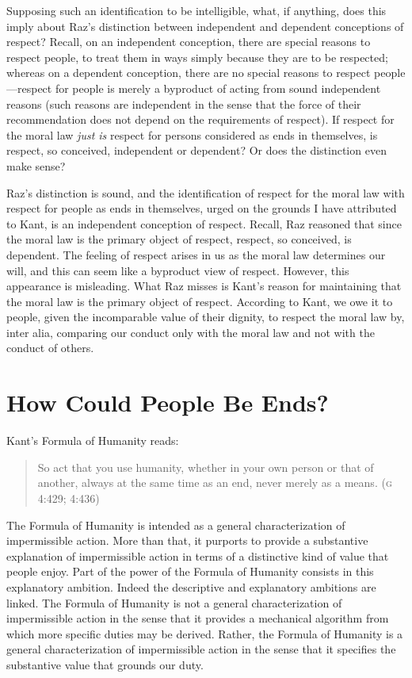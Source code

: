 \documentclass[12pt]{article}
\begin{document}
Supposing such an identification to be intelligible, what, if anything, does this imply about Raz's distinction between independent and dependent conceptions of respect? Recall, on an independent conception, there are special reasons to respect people, to treat them in ways simply because they are to be respected; whereas on a dependent conception, there are no special reasons to respect people---respect for people is merely a byproduct of acting from sound independent reasons (such reasons are independent in the sense that the force of their recommendation does not depend on the requirements of respect). If respect for the moral law \emph{just is} respect for persons considered as ends in themselves, is respect, so conceived, independent or dependent? Or does the distinction even make sense?

Raz's distinction is sound, and the identification of respect for the moral law with respect for people as ends in themselves, urged on the grounds I have attributed to Kant, is an independent conception of respect. Recall, Raz reasoned that since the moral law is the primary object of respect, respect, so conceived, is dependent. The feeling of respect arises in us as the moral law determines our will, and this can seem like a byproduct view of respect. However, this appearance is misleading. What Raz misses is Kant's reason for maintaining that the moral law is the primary object of respect. According to Kant, we owe it to people, given the incomparable value of their dignity, to respect the moral law by, inter alia, comparing our conduct only with the moral law and not with the conduct of others.


\section{How Could People Be Ends?} \label{sec:how_could_people_be_ends} %

Kant's Formula of Humanity reads: 
\begin{quote}
	So act that you use humanity, whether in your own person or that of another, always at the same time as an end, never merely as a means. (\textsc{g} 4:429; 4:436) 
\end{quote}

The Formula of Humanity is intended as a general characterization of impermissible action. More than that, it purports to provide a substantive explanation of impermissible action in terms of a distinctive kind of value that people enjoy. Part of the power of the Formula of Humanity consists in this explanatory ambition. Indeed the descriptive and explanatory ambitions are linked. The Formula of Humanity is not a general characterization of impermissible action in the sense that it provides a mechanical algorithm from which more specific duties may be derived. Rather, the Formula of Humanity is a general characterization of impermissible action in the sense that it specifies the substantive value that grounds our duty.
\end{document}
